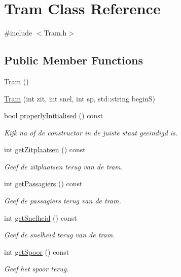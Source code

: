 \hypertarget{class_tram}{}\section{Tram Class Reference}
\label{class_tram}


{\ttfamily \#include $<$Tram.\+h$>$}

\subsection*{Public Member Functions}
\begin{DoxyCompactItemize}
\item 
\hyperlink{class_tram_aad83b2e7e79d57528691bf317ab0e1ef}{Tram} ()
\item 
\hyperlink{class_tram_afef6559a85225dc0b8a9445d6d16cbbb}{Tram} (int zit, int snel, int sp, std\+::string beginS)
\item 
bool \hyperlink{class_tram_a98992eff0453f54fbe64e1f1064169c7}{properly\+Initialised} () const 
\begin{DoxyCompactList}\small\item\em Kijk na of de constructor in de juiste staat geeindigd is. \end{DoxyCompactList}\item 
int \hyperlink{class_tram_aa366e37291186d6cfd402aa7b6cfec2d}{get\+Zitplaatsen} () const 
\begin{DoxyCompactList}\small\item\em Geef de zitplaatsen terug van de tram. \end{DoxyCompactList}\item 
int \hyperlink{class_tram_a8e9e449f0032f0f439c196e0980a891e}{get\+Passagiers} () const 
\begin{DoxyCompactList}\small\item\em Geef de passagiers terug van de tram. \end{DoxyCompactList}\item 
int \hyperlink{class_tram_a40a12ae66cdc8965fc73d548dd038e4c}{get\+Snelheid} () const 
\begin{DoxyCompactList}\small\item\em Geef de snelheid terug van de tram. \end{DoxyCompactList}\item 
int \hyperlink{class_tram_a52655f991ffb58a8ab3557fd881a6f58}{get\+Spoor} () const 
\begin{DoxyCompactList}\small\item\em Geef het spoor terug. \end{DoxyCompactList}\item 

\end{DoxyCompactItemize}
